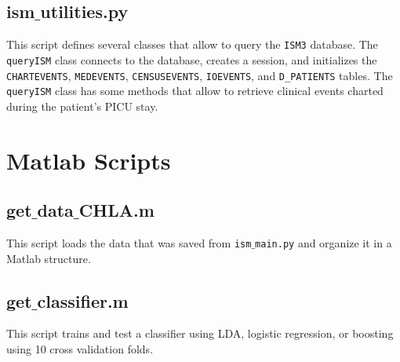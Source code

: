 \documentclass[
   technote
]{phildoc}
\begin{document}


\newpage
\subsection{ism$\_$utilities.py}
This script defines several classes that allow to query the \texttt{ISM3} database. The \texttt{queryISM} class connects to the database, creates a session, and initializes the \texttt{CHARTEVENTS}, \texttt{MEDEVENTS}, \texttt{CENSUSEVENTS}, \texttt{IOEVENTS}, and \verb|D_PATIENTS| tables. The \texttt{queryISM} class has some methods that allow to retrieve clinical events charted during the patient's PICU stay.       




\cleardoublepage 
\newpage
\section{Matlab Scripts}
\subsection{get$\_$data$\_$CHLA.m}
This script loads the data that was saved from \texttt{ism$\_$main.py} and organize it in a Matlab structure.       



\cleardoublepage 
\newpage

\subsection{get$\_$classifier.m}
This script trains and test a classifier using LDA, logistic regression, or boosting using 10 cross validation folds.      
\end{document}
